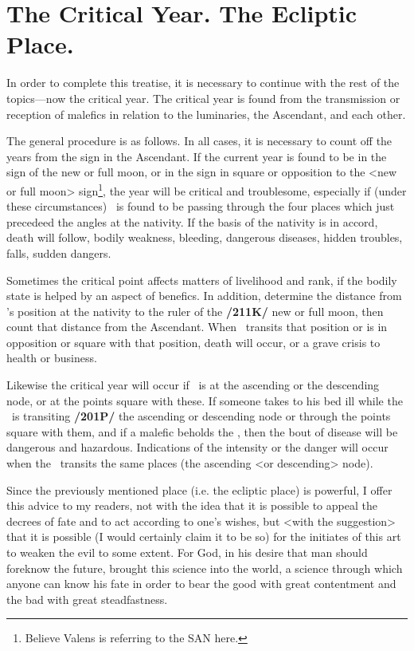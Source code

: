 \section{The Critical Year. The Ecliptic Place.}

In order to complete this treatise, it is necessary to continue with the rest of the topics—now the critical year. The critical year is found from the transmission or reception of malefics in relation to the luminaries, the Ascendant, and each other. 

The general procedure is as follows. In all cases, it is necessary
to count off the years from the sign in the Ascendant. If the current year is found to be in the sign of the new or full moon, or in the sign in square or opposition to the <new or full moon> sign\footnote{Believe Valens is referring to the SAN here.}, the year will be critical and troublesome, especially if (under these circumstances) \Saturn\, is found to be passing through the four places which just precedeed the angles at the nativity. If the basis of the nativity is in accord, death will follow, bodily weakness, bleeding, dangerous diseases, hidden troubles, falls, sudden dangers.

Sometimes the critical point affects matters of livelihood and rank, if the bodily state is helped by an aspect of benefics. In addition, determine the distance from \Saturn’s position at the nativity to the ruler of the \textbf{/211K/} new or full moon, then count that distance from the Ascendant. When \Saturn\, transits that position or is in opposition or square with that position, death will occur, or a grave crisis to health or business. 

Likewise the critical year will occur if \Saturn\, is at the ascending or the descending node, or at the points square with these. If someone takes to his bed ill while the \Sun\, is transiting \textbf{/201P/} the ascending or descending node or through the points square with them, and if a malefic beholds the \Sun, then the bout of disease will be dangerous and hazardous. Indications of the intensity or the danger will occur when the \Moon\, transits the same places (the ascending <or descending> node).

Since the previously mentioned place (i.e. the ecliptic place) is powerful, I offer this advice to my readers, not with the idea that it is possible to appeal the decrees of fate and to act according to one’s wishes, but <with the suggestion> that it is possible (I would certainly claim it to be so) for the initiates of this art to weaken the evil to some extent. For God, in his desire that man should foreknow the future, brought this science into the world, a science through which anyone can know his fate in order to bear the good with great contentment and the bad with great steadfastness. 

